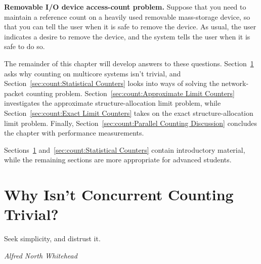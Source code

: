 \QuickQuiz{}
	{ \bfseries Removable I/O device access-count problem. }
	Suppose that you need to maintain a reference count on a
	heavily used removable mass-storage device, so that you
	can tell the user when it is safe to remove the device.
	As usual, the user indicates a desire to remove the device, and
	the system tells the user when it is safe to do so.
 \QuickQuizEnd

\QuickQuizLabel{\QcountQIOcnt}

The remainder of this chapter will develop answers to these questions.
Section~\ref{sec:count:Why Isn't Concurrent Counting Trivial?}
asks why counting on multicore systems isn't trivial, and
Section~\ref{sec:count:Statistical Counters}
looks into ways of solving the network-packet counting problem.
Section~\ref{sec:count:Approximate Limit Counters}
investigates the approximate structure-allocation limit problem, while
Section~\ref{sec:count:Exact Limit Counters}
takes on the exact structure-allocation limit problem.
Finally, Section~\ref{sec:count:Parallel Counting Discussion}
concludes the chapter with performance measurements.

Sections~\ref{sec:count:Why Isn't Concurrent Counting Trivial?}
and~\ref{sec:count:Statistical Counters}
contain introductory material, while the remaining sections
are more appropriate for advanced students.

\section{Why Isn't Concurrent Counting Trivial?}
\label{sec:count:Why Isn't Concurrent Counting Trivial?}
%
\epigraph{Seek simplicity, and distrust it.}{\emph{Alfred North Whitehead}}

